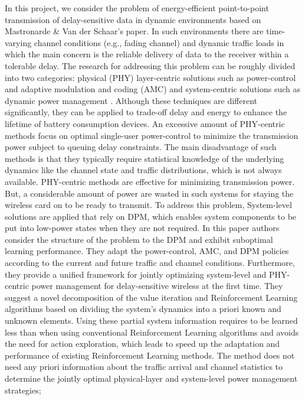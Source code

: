 \documentclass[a4paper, 12pt]{report}
\begin{document}
In this project, we consider the problem of energy-efficient point-to-point
transmission of delay-sensitive data in dynamic environments based on Mastronarde \& Van der Schaar's paper. In such environments there are time-varying channel conditions (e.g., fading channel) and dynamic traffic loads in which the main concern is the reliable delivery of data to the receiver within a tolerable delay. 
The research for addressing this problem can be roughly divided into two categories: 
physical (PHY) layer-centric solutions such as power-control and adaptive modulation and coding (AMC) 
and system-centric solutions such as dynamic power management \cite{Mastronarde-2011}.
Although these techniques are different significantly, they
can be applied to trade-off delay and energy to enhance the lifetime of battery consumption devices.
An excessive amount of PHY-centric methods focus on optimal single-user power-control to minimize
the transmission power subject to queuing delay constraints. 
The main disadvantage of such methods is that they typically require statistical knowledge of the underlying dynamics like the channel state and traffic distributions, which is not always available. 
PHY-centric methods are effective for minimizing transmission power. 
But, a considerable amount of power are wasted in such systems for staying the wireless
card on to be ready to transmit. 
To address this problem, System-level solutions are applied that  rely on DPM, which enables system components to be put into low-power states when they are not required. 
In this paper authors consider the structure of the problem to the DPM and exhibit suboptimal learning performance. They adapt the power-control, AMC, and DPM policies according to the current and future traffic and channel conditions. 
Furthermore, they provide a unified framework for jointly optimizing system-level and PHY-centric power management for delay-sensitive wireless at the first time.
They suggest a novel decomposition of the value iteration and Reinforcement Learning algorithms based on dividing the system’s dynamics into a priori known and unknown elements. Using these partial system information requires to be learned less than when using conventional Reinforcement Learning algorithms and avoids the need for action exploration, which leads to speed up the adaptation and performance of existing Reinforcement Learning methods. 
The method does not need any priori information about the traffic arrival and channel statistics
to determine the jointly optimal physical-layer and system-level power management strategies; 
\end{document}
